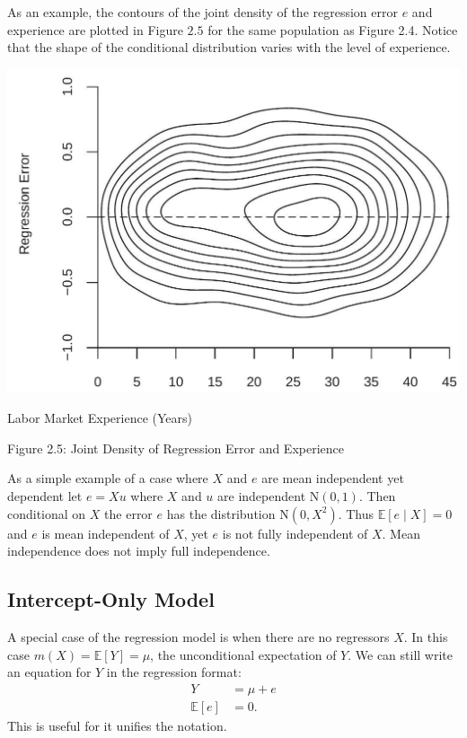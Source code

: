 \documentclass[10pt]{article}
\begin{document}
As an example, the contours of the joint density of the regression error $e$ and experience are plotted in Figure $2.5$ for the same population as Figure 2.4. Notice that the shape of the conditional distribution varies with the level of experience.

\includegraphics[max width=\textwidth]{2022_09_17_efa0deee3441d06e0b66g-12}

Labor Market Experience (Years)

Figure 2.5: Joint Density of Regression Error and Experience

As a simple example of a case where $X$ and $e$ are mean independent yet dependent let $e=X u$ where $X$ and $u$ are independent $\mathrm{N}(0,1)$. Then conditional on $X$ the error $e$ has the distribution $\mathrm{N}\left(0, X^{2}\right)$. Thus $\mathbb{E}[e \mid X]=0$ and $e$ is mean independent of $X$, yet $e$ is not fully independent of $X$. Mean independence does not imply full independence.

\subsection{Intercept-Only Model}
A special case of the regression model is when there are no regressors $X$. In this case $m(X)=\mathbb{E}[Y]=\mu$, the unconditional expectation of $Y$. We can still write an equation for $Y$ in the regression format:
$$
\begin{aligned}
Y &=\mu+e \\
\mathbb{E}[e] &=0 .
\end{aligned}
$$
This is useful for it unifies the notation.
\end{document}
